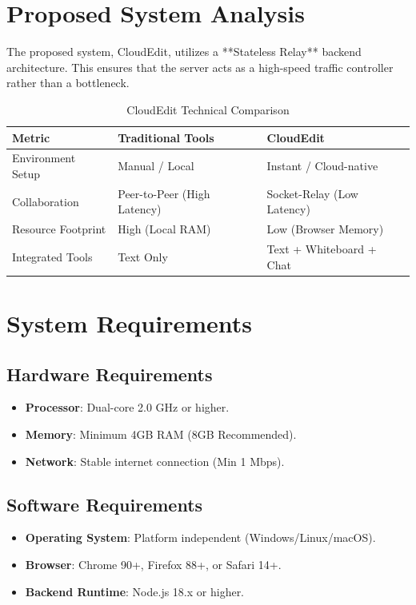 \documentclass[12pt,a4paper]{report}
\begin{document}
\section{Proposed System Analysis}
The proposed system, CloudEdit, utilizes a **Stateless Relay** backend architecture. This ensures that the server acts as a high-speed traffic controller rather than a bottleneck.
\begin{table}[h]
\centering
\caption{CloudEdit Technical Comparison}
\begin{tabularx}{\textwidth}{l X X}
\toprule
\textbf{Metric} & \textbf{Traditional Tools} & \textbf{CloudEdit} \\
\midrule
Environment Setup & Manual / Local & Instant / Cloud-native \\
Collaboration & Peer-to-Peer (High Latency) & Socket-Relay (Low Latency) \\
Resource Footprint & High (Local RAM) & Low (Browser Memory) \\
Integrated Tools & Text Only & Text + Whiteboard + Chat \\
\bottomrule
\end{tabularx}
\end{table}

\section{System Requirements}
\subsection{Hardware Requirements}
\begin{itemize}
    \item \textbf{Processor}: Dual-core 2.0 GHz or higher.
    \item \textbf{Memory}: Minimum 4GB RAM (8GB Recommended).
    \item \textbf{Network}: Stable internet connection (Min 1 Mbps).
\end{itemize}

\subsection{Software Requirements}
\begin{itemize}
    \item \textbf{Operating System}: Platform independent (Windows/Linux/macOS).
    \item \textbf{Browser}: Chrome 90+, Firefox 88+, or Safari 14+.
    \item \textbf{Backend Runtime}: Node.js 18.x or higher.
\end{itemize}
\end{document}

